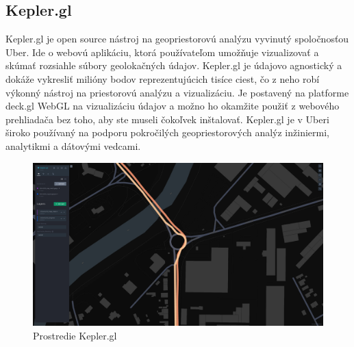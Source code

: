 \subsection{Kepler.gl}
Kepler.gl je open source nástroj na geopriestorovú analýzu vyvinutý spoločnosťou Uber. Ide o webovú aplikáciu, ktorá používateľom umožňuje vizualizovať a skúmať rozsiahle súbory geolokačných údajov. Kepler.gl je údajovo agnostický a dokáže vykresliť milióny bodov reprezentujúcich tisíce ciest, čo z neho robí výkonný nástroj na priestorovú analýzu a vizualizáciu. Je postavený na platforme deck.gl WebGL na vizualizáciu údajov a možno ho okamžite použiť z webového prehliadača bez toho, aby ste museli čokoľvek inštalovať. Kepler.gl je v Uberi široko používaný na podporu pokročilých geopriestorových analýz inžiniermi, analytikmi a dátovými vedcami\cite{kepler1}\cite{kepler2}\cite{kepler3}.
\begin{figure}[H]
    \centering
    \includegraphics[width = \linewidth]{img/kepler.png}
    \caption{Prostredie Kepler.gl}
\end{figure}
